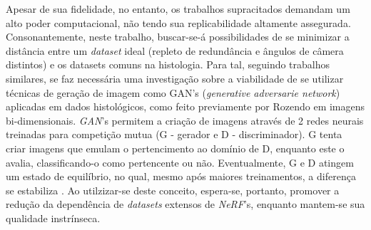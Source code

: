 Apesar de sua fidelidade, no entanto, os trabalhos supracitados demandam um alto poder computacional, não tendo sua replicabilidade altamente assegurada. Consonantemente, neste trabalho, buscar-se-á possibilidades de se minimizar a distância entre um \textit{dataset} ideal (repleto de redundância e ângulos de câmera distintos) e os datasets comuns na histologia. Para tal, seguindo trabalhos similares, se faz necessária uma investigação sobre a viabilidade de se utilizar técnicas de geração de imagem como GAN's (\textit{generative adversarie network}) aplicadas em dados histológicos, como feito previamente por Rozendo \cite{rozendo2024histdataaug} em imagens bi-dimensionais.   \textit{GAN}'s  permitem a criação de imagens através de 2 redes neurais treinadas para competição mutua (G - gerador e  D - discriminador). G tenta criar imagens que emulam o pertencimento ao domínio de D, enquanto este o avalia, classificando-o como pertencente ou não. Eventualmente, G e D atingem um estado de equilíbrio, no qual, mesmo após maiores treinamentos, a diferença se estabiliza \cite{goodfellow2014generativeadversarialnetworks} . Ao utilzizar-se deste conceito, espera-se, portanto, promover a redução da dependência de \textit{datasets} extensos de \textit{NeRF}'s, enquanto mantem-se sua qualidade instrínseca.


\newpage
